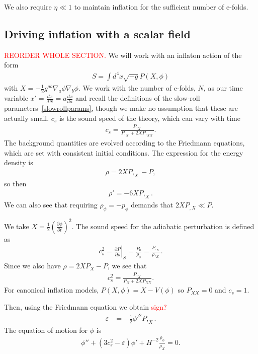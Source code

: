 We also require $\eta\ll1$ to maintain inflation for the sufficient number
of e-folds.


    \subsection{Driving inflation with a scalar field}
\textcolor{red}{REORDER WHOLE SECTION.}
We will work with an inflaton action of the form
\begin{align}
S = \int d^4x \sqrt{-g}P(X,\phi)
\end{align}
with $X=-\frac{1}{2}g^{ab}\nabla_a \phi\nabla_b \phi$.
We work with the number of e-folds, $N$, as our time variable
$x'=\frac{dx}{dN}=a\frac{dx}{da}$
and recall the definitions of the slow-roll parameters~\eqref{slowrollparams},
though we make no assumption that these are actually small.
$c_s$ is the sound speed of the theory, which can vary with time~\cite{Christopherson_2009}
\begin{align}
c_s=\frac{P,_X}{P,_X+2XP,_{XX}}.
\end{align}
The background quantities are evolved according to the Friedmann equations,
which are set with consistent initial conditions.
The expression for the energy density is~\cite{Christopherson_2009}
\begin{align}
    \rho = 2XP,_X-P,
\end{align}
so then
\begin{align}
    \rho' = -6XP,_X.
\end{align}
We can also see that requiring $\rho_\phi=-p_\phi$ demands that
$2XP_{,X}\ll P$.


    We take $X=\frac{1}{2}\left(\frac{\partial\phi}{\partial t}\right)^2$.
    The sound speed for the adiabatic perturbation is defined as
    \begin{align}\label{sound_speed_definition}
        c_s^2 = \left. \frac{\partial P}{\partial \rho} \right|_S = \frac{\dot{P}_0}{\dot{\rho}_0}
        = \frac{P,_X}{\rho,_X}.
    \end{align}
    Since we also have $\rho=2X P_X-P$, we see that
    \begin{align}
        c_s^2 = \frac{P,_X}{P_X+2X P_{XX}}.
    \end{align}
    For canonical inflation models, $P(X,\phi)=X-V(\phi)$
    so $P_{XX}=0$ and $c_s=1$.


Then, using the Friedmann equation we obtain
\textcolor{red}{sign?}
\begin{align}\label{PXepsilon}
    \varepsilon &= -\frac{1}{2}{\phi'}^2P,_X.
\end{align}
The equation of motion for $\phi$ is~\cite{Hu_2011}
\begin{align}\label{phieom}
    \phi''+(3c_s^2-\varepsilon)\phi'+H^{-2}\frac{\rho_\phi}{\rho_X}=0.
\end{align}


